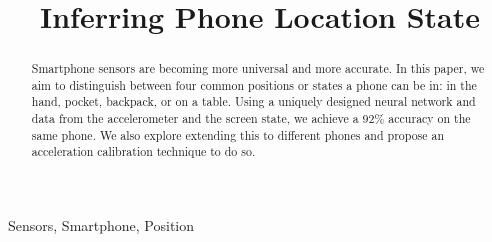 \documentclass[conference]{IEEEtran}
\begin{document}
\title{Inferring Phone Location State}

\author{
\and
{}
\and
{}
\and
{}
}


\maketitle


\begin {abstract}Smartphone sensors are becoming more universal and more accurate. In this paper, we aim to distinguish between four common positions or states a phone can be in: in the hand, pocket, backpack, or on a table. Using a uniquely designed neural network and data from the accelerometer and the screen state, we achieve a 92\% accuracy on the same phone. We also explore extending this to different phones and propose an acceleration calibration technique to do so. 
\end{abstract}

\begin{IEEEkeywords}
Sensors, Smartphone, Position
\end{IEEEkeywords}








\nocite{}

\vfill

{\small
}
\end{document}
